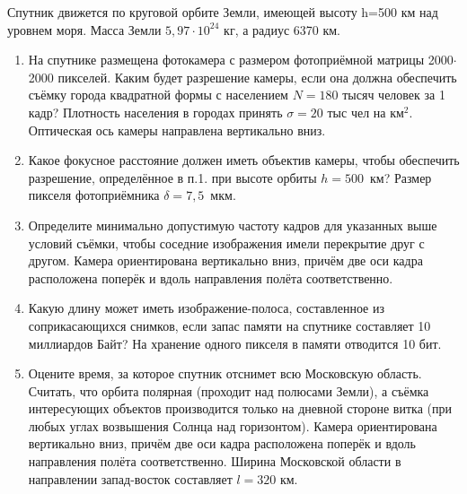 
Спутник движется по круговой орбите Земли, имеющей высоту h=500 км над уровнем моря. Масса Земли 
$5,97 \cdot 10^{24}$ кг, а радиус 6370 км.

\begin{enumerate}
    \item На спутнике размещена фотокамера с размером фотоприёмной матрицы 2000$\cdot$2000 пикселей. Каким будет 
    разрешение камеры, если она должна обеспечить съёмку города квадратной формы с населением $N=180$ тысяч 
    человек  за 1 кадр? Плотность населения в городах принять $\sigma=20$ тыс чел на км$^2$. Оптическая ось 
    камеры направлена вертикально вниз.
    \item Какое фокусное расстояние должен иметь объектив камеры, чтобы обеспечить разрешение, определённое в п.1. 
    при высоте орбиты  $h=500$~км? Размер пикселя фотоприёмника \linebreak $\delta=7,5$~мкм.
    \item Определите минимально допустимую частоту кадров для указанных выше условий съёмки, чтобы соседние 
    изображения имели перекрытие друг с другом. Камера ориентирована вертикально вниз, причём две оси кадра 
    расположена поперёк и вдоль направления полёта соответственно.
    \item Какую длину может иметь изображение-полоса, составленное из соприкасающихся снимков, если запас 
    памяти на спутнике составляет 10 миллиардов Байт?  На хранение одного пикселя в памяти отводится 10 бит.
    \item Оцените время, за которое спутник отснимет всю Московскую область. Считать, что орбита полярная 
    (проходит над полюсами Земли), а съёмка интересующих объектов производится только на дневной стороне витка 
    (при любых углах возвышения Солнца над горизонтом). Камера ориентирована вертикально вниз, причём две оси 
    кадра расположена поперёк и вдоль направления полёта соответственно. Ширина Московской области в направлении 
    запад-восток составляет $l=320$ км.
\end{enumerate}